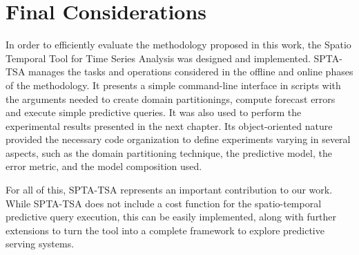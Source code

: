 \section{Final Considerations}
\label{Sec:implementation_summary}

In order to efficiently evaluate the methodology proposed in this work, the Spatio Temporal Tool for Time Series Analysis was designed and implemented. SPTA-TSA manages the tasks and operations considered in the offline and online phases of the methodology. It presents a simple command-line interface in scripts with the arguments needed to create domain partitionings, compute forecast errors and execute simple predictive queries. It was also used to perform the experimental results presented in the next chapter. Its object-oriented nature provided the necessary code organization to define experiments varying in several aspects, such as the domain partitioning technique, the predictive model, the error metric, and the model composition used.

For all of this, SPTA-TSA represents an important contribution to our work. While SPTA-TSA does not include a cost function for the spatio-temporal predictive query execution, this can be easily implemented, along with further extensions to turn the tool into a complete framework to explore predictive serving systems.